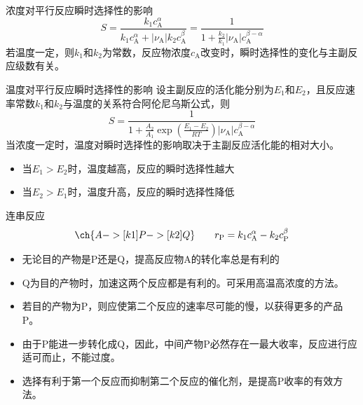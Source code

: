 \begin{frame}{浓度对平行反应瞬时选择性的影响}
	\[
        S=\frac{k_1c_\mathrm{A}^\alpha}{k_1c_\mathrm{A}^\alpha+|{\nu_\mathrm{A}}|k_2c_\mathrm{A}^\beta}=\frac{1}{1+\frac{k_2}{k_1}|{\nu_\mathrm{A}}|c_\mathrm{A}^{\beta -\alpha}}
    \]
	若温度一定，则$k_1$和$k_2$为常数，反应物浓度$c_\mathrm{A}$改变时，瞬时选择性的变化与主副反应级数有关。
\end{frame}


\begin{frame}{温度对平行反应瞬时选择性的影响}
	设主副反应的活化能分别为$E_1$和$E_2$，且反应速率常数$k_1$和$k_2$与温度的关系符合阿伦尼乌斯公式，则
    \[
        S=\frac{1}{1+\frac{A_2}{A_1}\exp(\frac{E_1-E_2}{RT})|{\nu_\mathrm{A}}|c_\mathrm{A}^{\beta -\alpha}}
    \]
	当浓度一定时，温度对瞬时选择性的影响取决于主副反应活化能的相对大小。
    
    \begin{itemize}
		\item 当$E_1> E_2$时，温度越高，反应的瞬时选择性越大
		\item 当$E_2> E_1$时，温度升高，反应的瞬时选择性降低
	\end{itemize}
	
\end{frame}


\begin{frame}{连串反应}
    \[
        \ch{A ->[k1] P ->[k2] Q} \qquad r_\mathrm{P} = k_1c_\mathrm{A}^\alpha - k_2c_\mathrm{P}^\beta
    \]
    \begin{itemize}
      \item 无论目的产物是P还是Q，提高反应物A的转化率总是有利的
      \item Q为目的产物时，加速这两个反应都是有利的。可采用高温高浓度的方法。
      \item 若目的产物为P，则应使第二个反应的速率尽可能的慢，以获得更多的产品P。
      \item 由于P能进一步转化成Q，因此，中间产物P必然存在一最大收率，反应进行应适可而止，不能过度。
      \item 选择有利于第一个反应而抑制第二个反应的催化剂，是提高P收率的有效方法。
    \end{itemize}
\end{frame}


